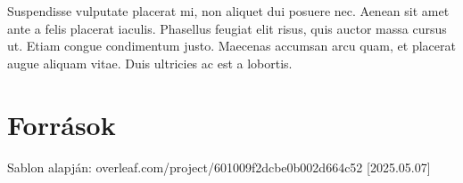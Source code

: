\documentclass{labreport}
\begin{document}
Suspendisse vulputate placerat mi, non aliquet dui posuere nec. Aenean sit amet ante a felis placerat iaculis. Phasellus feugiat elit risus, quis auctor massa cursus ut. Etiam congue condimentum justo. Maecenas accumsan arcu quam, et placerat augue aliquam vitae. Duis ultricies ac est a lobortis. 


\newpage

\clearpage

\nocite{*} %
\printbibliography

\section{Források}

Sablon alapján: overleaf.com/project/601009f2dcbe0b002d664c52 [2025.05.07]
\end{document}
